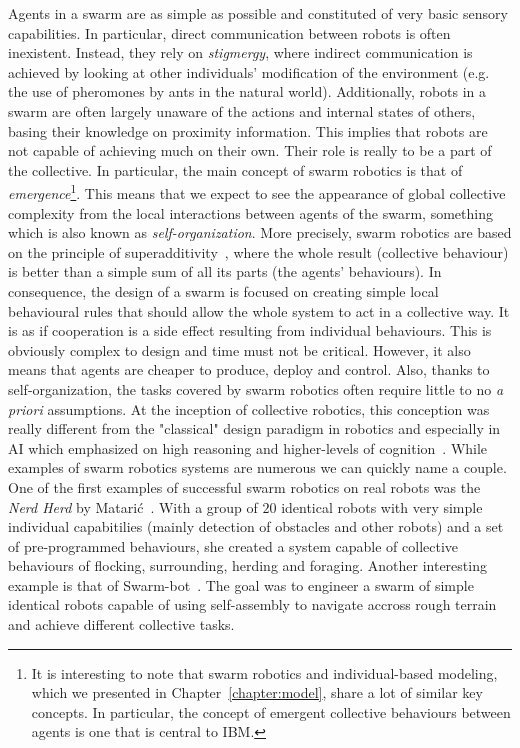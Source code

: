     Agents in a swarm are as simple as possible and constituted of very basic sensory capabilities. In particular, direct communication between robots is often inexistent. Instead, they rely on \emph{stigmergy}, where indirect communication is achieved by looking at other individuals' modification of the environment (e.g. the use of pheromones by ants in the natural world). Additionally, robots in a swarm are often largely unaware of the actions and internal states of others, basing their knowledge on proximity information. This implies that robots are not capable of achieving much on their own. Their role is really to be a part of the collective. In particular, the main concept of swarm robotics is that of \emph{emergence}\footnote{It is interesting to note that swarm robotics and individual-based modeling, which we presented in Chapter~\ref{chapter:model}, share a lot of similar key concepts. In particular, the concept of emergent collective behaviours between agents is one that is central to IBM.}. This means that we expect to see the appearance of global collective complexity from the local interactions between agents of the swarm, something which is also known as \emph{self-organization}. More precisely, swarm robotics are based on the principle of superadditivity~\parencite{Parker2008}, where the whole result (collective behaviour) is better than a simple sum of all its parts (the agents' behaviours). In consequence, the design of a swarm is focused on creating simple local behavioural rules that should allow the whole system to act in a collective way. It is as if cooperation is a side effect resulting from individual behaviours. This is obviously complex to design and time must not be critical. However, it also means that agents are cheaper to produce, deploy and control. Also, thanks to self-organization, the tasks covered by swarm robotics often require little to no \emph{a priori} assumptions. At the inception of collective robotics, this conception was really different from the "classical" design paradigm in robotics and especially in AI which emphasized on high reasoning and higher-levels of cognition~\parencite{Bonabeau1999}. While examples of swarm robotics systems are numerous we can quickly name a couple. One of the first examples of successful swarm robotics on real robots was the \emph{Nerd Herd} by Matarić~\parencite{Mataric1995}. With a group of $20$ identical robots with very simple individual capabitilies (mainly detection of obstacles and other robots) and a set of pre-programmed behaviours, she created a system capable of collective behaviours of flocking, surrounding, herding and foraging. Another interesting example is that of Swarm-bot~\parencite{Mondada2004, Dorigo2004, Mondada2005}. The goal was to engineer a swarm of simple identical robots capable of using self-assembly to navigate accross rough terrain and achieve different collective tasks.

